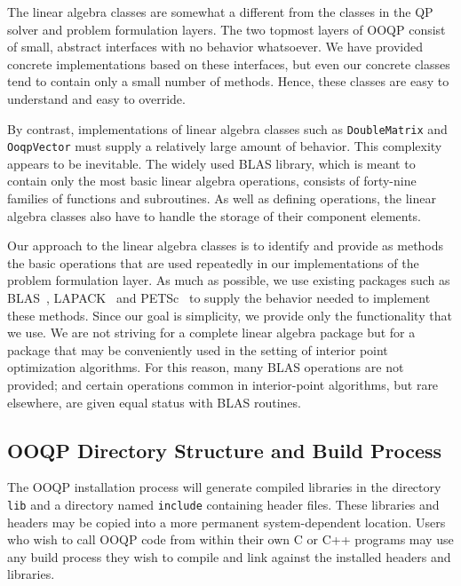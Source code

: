 The linear algebra classes are somewhat a different from
the classes in the QP solver and problem formulation layers. The two
topmost layers of OOQP consist of small, abstract interfaces with no
behavior whatsoever. We have provided concrete implementations based
on these interfaces, but even our concrete classes tend to contain
only a small number of methods. Hence, these classes are easy to
understand and easy to override.

By contrast, implementations of linear algebra classes such as
\texttt{DoubleMatrix} and \texttt{OoqpVector} must supply a relatively
large amount of behavior. This complexity appears to be inevitable.
The widely used BLAS library, which is meant to contain only the most
basic linear algebra operations, consists of forty-nine families of
functions and subroutines.
As well as defining operations, the linear algebra classes also have
to handle the storage of their component elements.

Our approach to the linear algebra classes is to identify and provide
as methods the basic operations that are used repeatedly in our
implementations of the problem formulation layer. As much as possible,
we use existing packages such as BLAS~\cite{lawson79basic},
LAPACK~\cite{lapack} and
PETSc~\cite{petsc-home-page,petsc-efficient,petsc-manual} to supply
the behavior needed to implement these methods. Since our goal is
simplicity, we provide only the functionality that we use. We are not
striving for a complete linear algebra package but for a package
that may be conveniently used in the setting of interior point
optimization algorithms. For this reason, many BLAS operations are not
provided; and certain operations common in interior-point algorithms,
but rare elsewhere, are given equal status with BLAS routines.


\subsection{OOQP Directory Structure and Build Process}

The OOQP installation process will generate compiled libraries in the
directory \texttt{lib} and a directory named \texttt{include}
containing header files.  These libraries and headers may be copied
into a more permanent system-dependent location. Users who wish to
call OOQP code from within their own C or C++ programs may use any
build process they wish to compile and link against the installed
headers and libraries.

